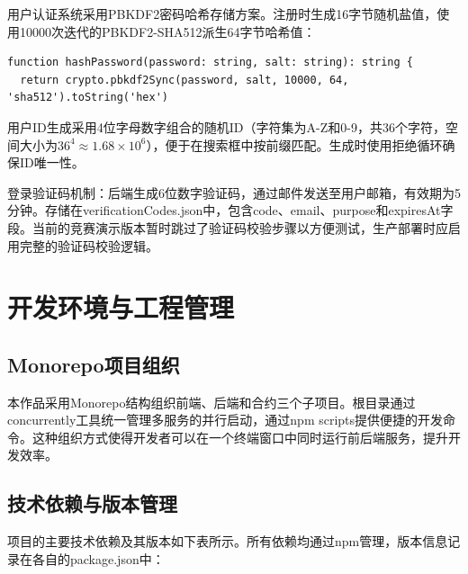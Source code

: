 \documentclass[UTF8,a4paper,zihao=-4,openany]{ctexrep}
\begin{document}
用户认证系统采用PBKDF2密码哈希存储方案。注册时生成16字节随机盐值，使用10000次迭代的PBKDF2-SHA512派生64字节哈希值：

\begin{lstlisting}[caption={PBKDF2密码哈希 (userService.ts:66-68)}]
function hashPassword(password: string, salt: string): string {
  return crypto.pbkdf2Sync(password, salt, 10000, 64, 'sha512').toString('hex')
\end{lstlisting}

用户ID生成采用4位字母数字组合的随机ID（字符集为A-Z和0-9，共36个字符，空间大小为$36^4 \approx 1.68 \times 10^6$），便于在搜索框中按前缀匹配。生成时使用拒绝循环确保ID唯一性。

登录验证码机制：后端生成6位数字验证码，通过邮件发送至用户邮箱，有效期为5分钟。存储在verificationCodes.json中，包含code、email、purpose和expiresAt字段。当前的竞赛演示版本暂时跳过了验证码校验步骤以方便测试，生产部署时应启用完整的验证码校验逻辑。

\section{开发环境与工程管理}

\subsection{Monorepo项目组织}

本作品采用Monorepo结构组织前端、后端和合约三个子项目。根目录通过concurrently工具统一管理多服务的并行启动，通过npm scripts提供便捷的开发命令。这种组织方式使得开发者可以在一个终端窗口中同时运行前后端服务，提升开发效率。

\subsection{技术依赖与版本管理}

项目的主要技术依赖及其版本如下表所示。所有依赖均通过npm管理，版本信息记录在各自的package.json中：
\end{document}
